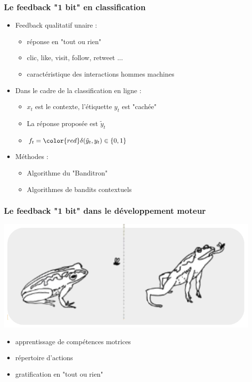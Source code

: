 \documentclass{beamer}
\begin{document}
\begin{frame}
	\frametitle{Le feedback "1 bit" en classification}
	
	\begin{itemize}
		\item Feedback qualitatif unaire :
		\begin{itemize}
			\item réponse en "tout ou rien"
			\item clic, like, visit, follow, retweet ...
			\item caractéristique des interactions hommes machines
		\end{itemize}
		\item Dans le cadre de la classification en ligne : 
		\begin{itemize}
			\item $x_t$ est le contexte, l'étiquette $y_t$ est "cachée"
			\item La réponse proposée est $\tilde{y}_t$
			\item $f_t = {\color{red}\delta(\tilde{y}_t ,y_t)} \in \{0,1\}$
		\end{itemize}
		\item Méthodes :
		\begin{itemize}
			\item Algorithme du "Banditron" \cite{kakade2008efficient}
			\item Algorithmes de bandits contextuels
		\end{itemize}
	\end{itemize}
\end{frame}

\begin{frame}
	\frametitle{Le feedback "1 bit" dans le développement moteur}
	\centerline{\includegraphics[width=.7\linewidth]{figs/cap-frog.png}}
	\begin{itemize}
		\item apprentissage de compétences motrices
		\item répertoire d'actions
		\item gratification en "tout ou rien"
	\end{itemize}
\end{frame}
\end{document}
